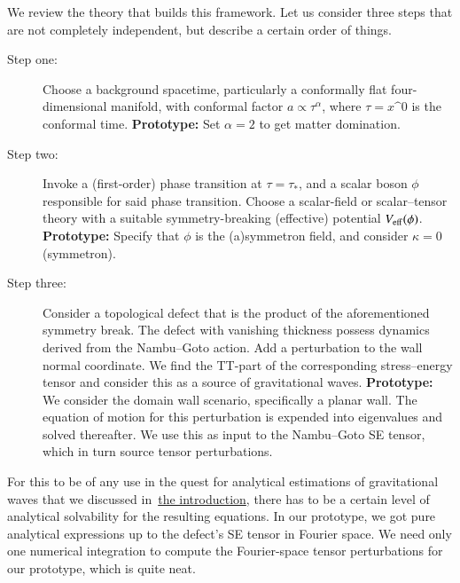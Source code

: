 









We review the theory that builds this framework. %
Let us consider three steps that are not completely independent, but describe a certain order of things.
\begin{description}
    \item[Step one:] Choose a background spacetime, particularly a conformally flat four-dimensional manifold, with conformal factor $a\propto \tau^\alpha$, where $\tau=x\^0$ is the conformal time. \textbf{Prototype:} Set $\alpha=2$ to get matter domination.
    \item[Step two:] Invoke a (first-order) phase transition at $\tau = \tau_\ast$, and a scalar boson $\phi$ responsible for said phase transition. Choose a scalar-field or scalar--tensor theory with a suitable symmetry-breaking (effective) potential $V_\mathrm{eff}(\phi)$. \textbf{Prototype:} Specify that $\phi$ is the (a)symmetron field, and consider $\kappa=0$ (symmetron).
    \item[Step three:] Consider a topological defect that is the product of the aforementioned symmetry break. The defect with vanishing thickness possess dynamics derived from the Nambu--Goto action. Add a perturbation to the wall normal coordinate. We find the TT-part of the corresponding stress--energy tensor and consider this as a source of gravitational waves. \textbf{Prototype:} We consider the domain wall scenario, specifically a planar wall. The equation of motion for this perturbation is expended into eigenvalues and solved thereafter. We use this as input to the Nambu--Goto SE tensor, which in turn source tensor perturbations.
\end{description}
For this to be of any use in the quest for analytical estimations of gravitational waves that we discussed in~\hyperlink{sentence1}{the introduction}, there has to be a certain level of analytical solvability for the resulting equations. In our prototype, we got pure analytical expressions up to the defect's SE tensor in Fourier space. We need only one numerical integration to compute the Fourier-space tensor perturbations for our prototype, which is quite neat. %



